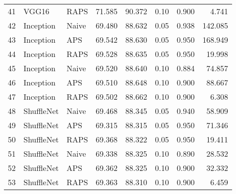\begin{tabular}{lllrrrrr}
41 &        VGG16 &      RAPS &  71.585 &  90.372 &   0.10 &     0.900 &    4.741 \\
42 &    Inception &     Naive &  69.480 &  88.632 &   0.05 &     0.938 &  142.085 \\
43 &    Inception &       APS &  69.542 &  88.630 &   0.05 &     0.950 &  168.949 \\
44 &    Inception &      RAPS &  69.528 &  88.635 &   0.05 &     0.950 &   19.998 \\
45 &    Inception &     Naive &  69.520 &  88.640 &   0.10 &     0.884 &   74.857 \\
46 &    Inception &       APS &  69.510 &  88.648 &   0.10 &     0.900 &   88.667 \\
47 &    Inception &      RAPS &  69.502 &  88.662 &   0.10 &     0.900 &    6.308 \\
48 &   ShuffleNet &     Naive &  69.468 &  88.345 &   0.05 &     0.940 &   58.909 \\
49 &   ShuffleNet &       APS &  69.315 &  88.315 &   0.05 &     0.950 &   71.346 \\
50 &   ShuffleNet &      RAPS &  69.368 &  88.322 &   0.05 &     0.950 &   19.411 \\
51 &   ShuffleNet &     Naive &  69.338 &  88.325 &   0.10 &     0.890 &   28.532 \\
52 &   ShuffleNet &       APS &  69.362 &  88.325 &   0.10 &     0.900 &   32.332 \\
53 &   ShuffleNet &      RAPS &  69.363 &  88.310 &   0.10 &     0.900 &    6.459 \\
\bottomrule
\end{tabular}
